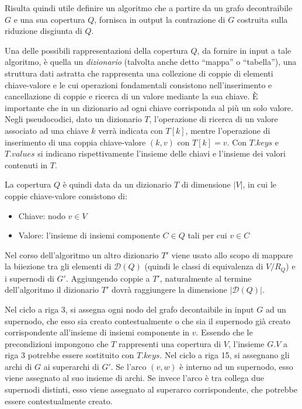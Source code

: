 Risulta quindi utile definire un algoritmo che a partire da un grafo decontraibile $G$ e una sua copertura $Q$,
fornisca in output la contrazione di $G$ costruita sulla riduzione disgiunta di $Q$.

Una delle possibili rappresentazioni della copertura $Q$, da fornire in input a tale algoritmo, è quella un
\textit{dizionario} (talvolta anche detto ``mappa'' o ``tabella''), una struttura dati astratta che rappresenta una
collezione di coppie di elementi chiave-valore e le cui operazioni fondamentali consistono nell'inserimento e
cancellazione di coppie e ricerca di un valore mediante la sua chiave. \`E importante che in un dizionario
ad ogni chiave corrisponda al più un solo valore.
Negli pseudocodici, dato un dizionario $T$, l'operazione di ricerca di un valore associato ad una chiave $k$ verrà
indicata con $T[k]$, mentre l'operazione di inserimento di una coppia chiave-valore $(k, v)$ con $T[k] = v$.
Con $T.keys$ e $T.values$ si indicano rispettivamente l'insieme delle chiavi e l'insieme dei valori contenuti in $T$.

La copertura $Q$ è quindi data da un dizionario $T$ di dimensione $|V|$, in cui le coppie chiave-valore consistono di:
\begin{itemize}
    \item Chiave: nodo $v \in V$
    \item Valore: l'insieme di insiemi componente $C \in Q$ tali per cui $v \in C$
\end{itemize}

Nel corso dell'algoritmo un altro dizionario $T'$ viene usato allo scopo di mappare la biiezione tra gli elementi
di $\mathcal{D}(Q)$ (quindi le classi di equivalenza di $V/R_Q$) e i supernodi di $G'$.
Aggiungendo coppie a $T'$, naturalmente al termine dell'algoritmo il dizionario $T'$ dovrà raggiungere la dimensione
$|\mathcal{D}(Q)|$. \newline

Nel ciclo a riga 3, si assegna ogni nodo del grafo decontaibile in input $G$ ad un supernodo, che esso sia
creato contestualmente o che sia il supernodo già creato corrispondente all'insieme di insiemi componente in $v$.
Essendo che le precondizioni impongono che $T$ rappresenti una copertura di $V$, l'insieme $G.V$ a riga 3
potrebbe essere sostituito con $T.keys$.
Nel ciclo a riga 15, si assegnano gli archi di $G$ ai superarchi di $G'$. Se l'arco $(v, w)$ è interno ad un
supernodo, esso viene assegnato al suo insieme di archi. Se invece l'arco è tra collega due supernodi distinti, esso
viene assegnato al superarco corrispondente, che potrebbe essere contestualmente creato.

